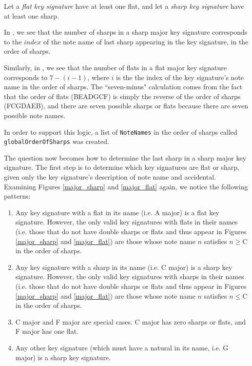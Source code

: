 \documentclass{report}
\begin{document}
\newpage

Let a \textit{flat key signature} have at least one flat, and let a \textit{sharp key signature} have at least one sharp.

In , we see that the number of sharps in a sharp major key signature corresponds to the $index$ of the note name of last sharp appearing in the key signature, in the order of sharps. 

Similarly, in , we see that the number of flats in a flat major key signature corresponds to $7-(i-1)$, where $i$ is the the index of the key signature's note name in the order of sharps. The ``seven-minus" calculation comes from the fact that the order of flats (BEADGCF) is simply the reverse of the order of sharps (FCGDAEB), and there are seven possible sharps or flats because there are seven possible note names. 

In order to support this logic, a list of \verb.NoteNames. in the order of sharps called \verb.globalOrderOfSharps. was created.

The question now becomes how to determine the last sharp in a sharp major key signature. The first step is to determine which key signatures are flat or sharp, given only the key signature's description of note name and accidental. Examining Figures \ref{major_sharp} and \ref{major_flat} again, we notice the following patterns:
\begin{enumerate}
\item  Any key  signature with a flat in its name (i.e. A\musFlat \; major) is a flat key signature. However, the only valid key signatures with flats in their names (i.e. those that do not have double sharps or flats and thus appear in Figures \ref{major_sharp} and \ref{major_flat}) are those whose note name $n$ satisfies $n \geq $\;C in the order of sharps.
\item  Any key  signature with a sharp in its name (i.e. C\musSharp \; major) is a sharp key signature. However, the only valid key signatures with sharps in their names (i.e. those that do not have double sharps or flats and thus appear in Figures \ref{major_sharp} and \ref{major_flat}) are those whose note name $n$ satisfies $n \leq $\;C in the order of sharps.
\item  C major and F major are special cases. C major has zero sharps or flats, and F  major has one flat.
\item  Any other key signature (which must have a natural in its name, i.e. G major) is a sharp key signature.
\end{enumerate}
\end{document}

